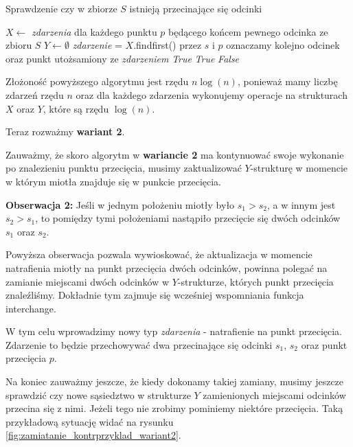 \begin{algorithm}[H]
	\caption{Sprawdzenie czy w zbiorze $S$ istnieją przecinające się odcinki}
	\begin{algorithmic}[1]
		\State $X \gets$ \textit{zdarzenia} dla każdego punktu $p$ będącego
		końcem pewnego odcinka ze zbioru $S$
		\State $Y \gets \emptyset$
		\State \textit{zdarzenie} = $X.$findfirst()
		\State przez $s$ i $p$ oznaczamy
		kolejno odcinek oraz punkt utożsamiony ze \textit{zdarzeniem}
		\State \Return \textit{True}
		\EndIf
		\Else
		\State \Return \textit{True}
		\EndIf
		\EndIf
		\EndWhile
		\State \Return \textit{False}
		\EndProcedure
	\end{algorithmic}
	\label{HasIntersectingSegments1}
\end{algorithm}

Złożoność powyższego algorytmu jest rzędu $n\log(n)$, ponieważ mamy liczbę zdarzeń
rzędu $n$ oraz dla każdego zdarzenia wykonujemy operacje na strukturach $X$ 
oraz $Y$, które są rzędu $\log(n)$.

Teraz rozważmy \textbf{wariant 2}.

Zauważmy, że skoro algorytm w \textbf{wariancie 2} ma kontynuować swoje wykonanie po znalezieniu punktu
przecięcia, musimy zaktualizować $Y$-strukturę w momencie w którym
miotła znajduje się w punkcie przecięcia. 

\textbf{Obserwacja 2:} Jeśli w jednym położeniu miotły było $s_1 > s_2$, a w innym 
jest $s_2 > s_1$, to pomiędzy tymi położeniami nastąpiło przecięcie się
dwóch odcinków $s_1$ oraz $s_2$.

Powyższa obserwacja pozwala wywioskować, że aktualizacja w momencie 
natrafienia miotły na punkt przecięcia dwóch odcinków, powinna polegać
na zamianie miejscami dwóch odcinków w $Y$-strukturze, których punkt przecięcia znaleźliśmy. Dokładnie tym zajmuje się wcześniej wspomniania funkcja interchange.

W tym celu wprowadzimy nowy typ \textit{zdarzenia} - natrafienie na punkt 
przecięcia. Zdarzenie to będzie przechowywać dwa przecinające się 
odcinki $s_1$, $s_2$ oraz punkt przecięcia $p$.

Na koniec zauważmy jeszcze, że kiedy dokonamy takiej zamiany, musimy 
jeszcze sprawdzić czy nowe sąsiedztwo w strukturze $Y$  zamienionych miejscami 
odcinków przecina się z nimi. Jeżeli tego nie zrobimy pominiemy niektóre przecięcia.
Taką przykładową sytuację widać na rysunku \ref{fig:zamiatanie_kontrprzyklad_wariant2}.


